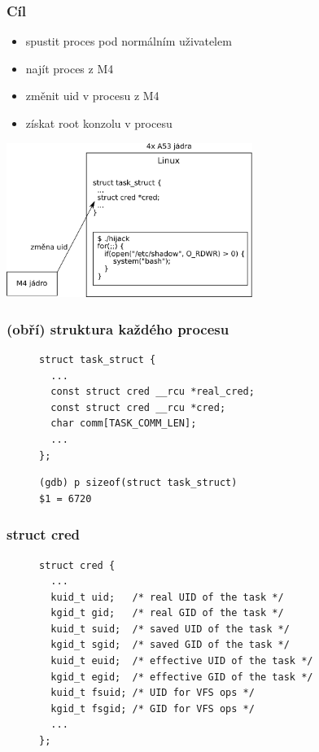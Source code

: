\documentclass{beamer}
\begin{document}
\begin{frame}
\frametitle{Cíl}
\begin{itemize}
	\item spustit proces pod normálním uživatelem
	\item najít proces z M4
	\item změnit uid v procesu z M4
	\item získat root konzolu v procesu
\end{itemize}
\flushright
\includegraphics[width=8cm]{figures/goal.pdf}
\end{frame}

\begin{frame}[fragile]
\frametitle{(obří) struktura každého procesu}
\begin{figure}
\begin{verbatim}
struct task_struct {
  ...
  const struct cred __rcu *real_cred;
  const struct cred __rcu *cred;
  char comm[TASK_COMM_LEN];
  ...
};
\end{verbatim}
\vspace{1cm}
\begin{verbatim}
(gdb) p sizeof(struct task_struct)
$1 = 6720
\end{verbatim}
\end{figure}
\end{frame}

\begin{frame}[fragile]
\frametitle{struct cred}
\begin{figure}
\begin{verbatim}
struct cred {
  ...
  kuid_t uid;   /* real UID of the task */
  kgid_t gid;   /* real GID of the task */
  kuid_t suid;  /* saved UID of the task */
  kgid_t sgid;  /* saved GID of the task */
  kuid_t euid;  /* effective UID of the task */
  kgid_t egid;  /* effective GID of the task */
  kuid_t fsuid; /* UID for VFS ops */
  kgid_t fsgid; /* GID for VFS ops */
  ...
};
\end{verbatim}
\end{figure}
\end{frame}
\end{document}
